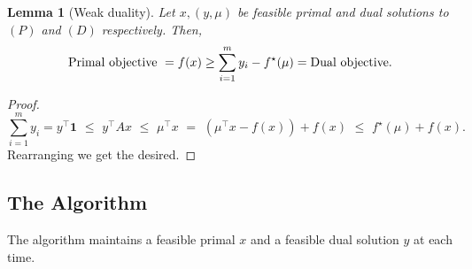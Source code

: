 \documentclass[letterpaper,11pt]{article}
\newtheorem{lemma}[thm]{Lemma}
\newcommand{\trans}{\intercal}
\begin{document}
\begin{lemma}[Weak duality]
Let $x, (y,\mu)$ be feasible primal and dual solutions to $(P)$ and $(D)$ respectively. Then,
\begin{equation}
\mbox{\rm Primal objective }= f(x) \geq \sum_{i=1}^{m}y_i - f^\star(\mu)= \mbox{\rm Dual objective}.
\end{equation}
\end{lemma}
\begin{proof}
$$\sum_{i=1}^m y_i =   y^\trans \mathbf{1} \,\,  \le  \,\, y^\trans Ax  \,\, \le  \,\, \mu^\trans  x  \,\, =  \,\, \left( \mu^\trans  x - f(x)\right) + f(x) \,\, \le  \,\, f^\star(\mu) + f(x).$$
Rearranging we get the desired.
\end{proof}

\subsection{The Algorithm}
\label{sec:alg-description}

The algorithm maintains a feasible primal $x$ and a feasible dual solution $y$ at each time.
\end{document}
